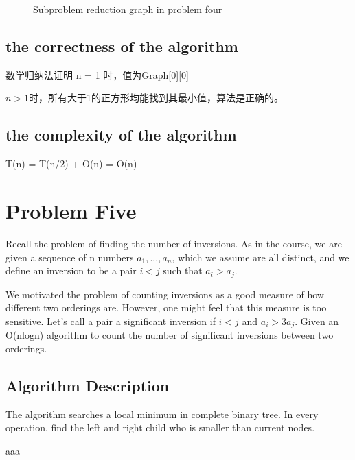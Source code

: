 \documentclass{article}
\begin{document}
\begin{CJK*}{UTF8}{gbsn}
\begin{figure}[H]
\caption{Subproblem reduction graph in problem four} 
\end{figure}

\subsection{the correctness of the algorithm}
数学归纳法证明
n = 1 时，值为Graph[0][0]

$n>1$时，所有大于1的正方形均能找到其最小值，算法是正确的。

\subsection{the complexity of the algorithm}
T(n) = T(n/2) + O(n) = O(n)

\newpage
\section{Problem Five}
Recall the problem of finding the number of inversions. As in the course, we are given a sequence of n numbers $a_1,...,a_n$, which we assume are all distinct, and we define an inversion to be a pair $i < j$ such that $a_i > a_j$.

We motivated the problem of counting inversions as a good measure of how different two orderings are. However, one might feel that this measure is too sensitive. Let's call a pair a significant inversion if $i < j$ and $a_i > 3a_j$. Given an O(nlogn) algorithm to count the number of significant inversions between two orderings.


\subsection{Algorithm Description}

The algorithm searches a local minimum in complete binary tree. In every operation, find the left and right child who is smaller than current nodes.

\begin{algorithm}[htbp]  
  \caption{aaa}  
  \begin{algorithmic}[1] 
    \EndFunction  
  \end{algorithmic}  
\end{algorithm} 


\end{CJK*}
\end{document}
